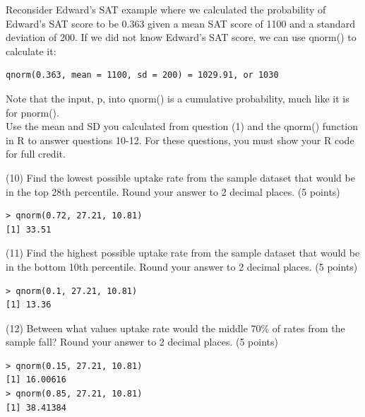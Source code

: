 \documentclass{article}
\begin{document}
Reconsider Edward's SAT example where we calculated the probability of Edward's SAT score to be 0.363 given a mean SAT score of 1100 and a standard deviation of 200. If we did not know Edward's SAT score, we can use qnorm() to calculate it:
\begin{center}
\begin{lstlisting}
qnorm(0.363, mean = 1100, sd = 200) = 1029.91, or 1030
\end{lstlisting}
\end{center}


Note that the input, p, into qnorm() is a cumulative probability, much like it is for pnorm().\\

Use the mean and SD you calculated from question (1) and the qnorm() function in R to answer questions 10-12. For these questions, you must show your R code for full credit.

 

(10) Find the lowest possible uptake rate from the sample dataset that would be in the top 28th percentile. Round your answer to 2 decimal places. (5 points)
\begin{center}
\begin{lstlisting}
> qnorm(0.72, 27.21, 10.81)
[1] 33.51
\end{lstlisting}
\end{center}
 

(11) Find the highest possible uptake rate from the sample dataset that would be in the bottom 10th percentile. Round your answer to 2 decimal places. (5 points)

\begin{center}
\begin{lstlisting}
> qnorm(0.1, 27.21, 10.81)
[1] 13.36
\end{lstlisting}
\end{center}

(12) Between what values uptake rate would the middle 70\% of rates from the sample fall? Round your answer to 2 decimal places. (5 points)

\begin{center}
\begin{lstlisting}
> qnorm(0.15, 27.21, 10.81)
[1] 16.00616
> qnorm(0.85, 27.21, 10.81)
[1] 38.41384
\end{lstlisting}
\end{center}
\end{document}
